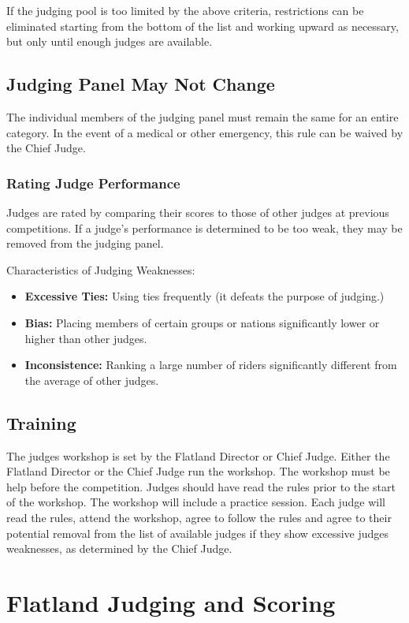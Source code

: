 If the judging pool is too limited by the above criteria, restrictions can be eliminated starting from the bottom of the list and working upward as necessary, but only until enough judges are available.

\subsection{Judging Panel May Not Change}

The individual members of the judging panel must remain the same for an entire category.
In the event of a medical or other emergency, this rule can be waived by the Chief Judge.

\subsubsection{Rating Judge Performance}
Judges are rated by comparing their scores to those of other judges at previous competitions.
If a judge’s performance is determined to be too weak, they may be removed from the judging panel.

Characteristics of Judging Weaknesses:
\begin{itemize}
\item \textbf{Excessive Ties:}
Using ties frequently (it defeats the purpose of judging.)
\item \textbf{Bias:}
Placing members of certain groups or nations significantly lower or higher than other judges.
\item\textbf{Inconsistence:}
Ranking a large number of riders significantly different from the average of other judges. 
\end{itemize}

\subsection{Training}
The judges workshop is set by the Flatland Director or Chief Judge.
Either the Flatland Director or the Chief Judge run the workshop.
The workshop must be help before the competition.
Judges should have read the rules prior to the start of the workshop.
The workshop will include a practice session.
Each judge will read the rules, attend the workshop,  agree to follow the rules and agree to their potential removal from the list of available judges if they show excessive judges weaknesses, as determined by the Chief Judge.

\section{Flatland Judging and Scoring \label{sec:flat\itemstreet_flatland\itemjudging\itemscoring}}

